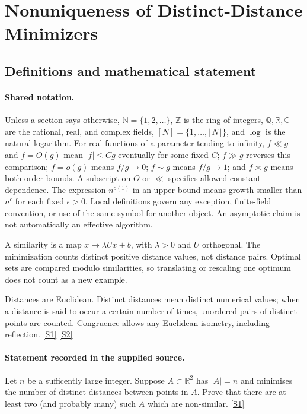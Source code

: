 \documentclass[11pt,a4paper]{article}
\newcommand{\N}{\mathbb{N}}
\newcommand{\Z}{\mathbb{Z}}
\newcommand{\Q}{\mathbb{Q}}
\newcommand{\R}{\mathbb{R}}
\newcommand{\C}{\mathbb{C}}
\newcommand{\sref}[2]{\hyperlink{source:#1:#2}{[S#2]}}
\begin{document}
\section{Nonuniqueness of Distinct-Distance Minimizers}\label{statement}


\subsection{Definitions and mathematical statement}

\paragraph{Shared notation.}Unless a section says otherwise, $\N=\{1,2,\ldots\}$,
$\Z$ is the ring of integers, $\Q,\R,\C$ are the rational, real, and complex
fields, $[N]=\{1,\ldots,\lfloor N\rfloor\}$, and $\log$ is the natural
logarithm. For real functions of a parameter tending to infinity,
$f\ll g$ and $f=O(g)$ mean $|f|\leq Cg$ eventually for some fixed $C$;
$f\gg g$ reverses this comparison; $f=o(g)$ means $f/g\to0$;
$f\sim g$ means $f/g\to1$; and $f\asymp g$ means both order bounds.
A subscript on $O$ or $\ll$ specifies allowed constant dependence.
The expression $n^{o(1)}$ in an upper bound means growth smaller than
$n^\epsilon$ for each fixed $\epsilon>0$. Local definitions govern any
exception, finite-field convention, or use of the same symbol for another
object. An asymptotic claim is not automatically an effective algorithm.



A similarity is a map $x\mapsto\lambda Ux+b$, with $\lambda>0$ and $U$ orthogonal. The minimization counts distinct positive distance values, not distance pairs. Optimal sets are compared modulo similarities, so translating or rescaling one optimum does not count as a new example.

Distances are Euclidean. Distinct distances mean distinct numerical values; when a distance is said to occur a certain number of times, unordered pairs of distinct points are counted. Congruence allows any Euclidean isometry, including reflection. \sref{statement}{1} \sref{statement}{2}

\paragraph{Statement recorded in the supplied source.}
Let $n$ be a sufficently large integer. Suppose $A\subset \mathbb{R}^2$ has $\lvert A\rvert=n$ and minimises the number of distinct distances between points in $A$. Prove that there are at least two (and probably many) such $A$ which are non-similar. \sref{statement}{1}
\end{document}
